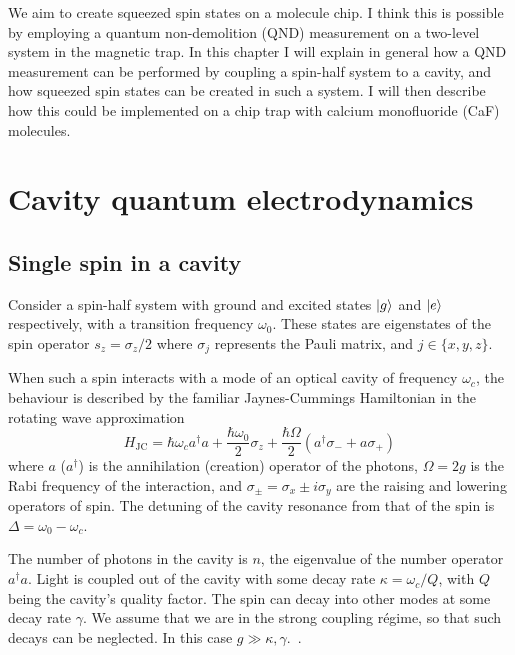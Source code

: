 We aim to create squeezed spin states on a molecule chip. I think this is
possible by employing a quantum non-demolition (QND) measurement on a two-level
system in the magnetic trap. In this chapter I will explain in general how
a QND measurement can be performed by coupling a spin-half system to a cavity,
and how squeezed spin states can be created in such a system. I will then
describe how this could be implemented on a chip trap with calcium monofluoride
(CaF) molecules.

\section{Cavity quantum electrodynamics}

\subsection{Single spin in a cavity}

Consider a spin-half system with ground and excited states $\ket{g}$
and $\ket{e}$ respectively, with a transition frequency $\omega_0$. These
states are eigenstates of the spin operator $s_z = \sigma_z /2$ where
$\sigma_j$ represents the Pauli matrix, and $j\in \{x,y,z\}$.

When such a spin interacts with a mode of an optical cavity of frequency
$\omega_c$, the behaviour is described by the familiar Jaynes-Cummings
Hamiltonian in the rotating wave approximation~\cite{}
%
\begin{equation}
  H_\text{JC} = \hbar\omega_c a^\dagger a + \frac{\hbar \omega_0}{2}\sigma_z +
  \frac{\hbar\Omega}{2}(a^\dagger \sigma_- + a\sigma_+)
  \label{squeeze:eqn:JCH}
\end{equation}
%
where $a$ ($a^\dagger$) is the annihilation (creation) operator of the photons,
$\Omega = 2g$ is the Rabi frequency of the interaction, and $\sigma_\pm =
\sigma_x \pm i\sigma_y$ are the raising and lowering operators of spin. The
detuning of the cavity resonance from that of the spin is $\Delta = \omega_0 -
\omega_c$.

The number of photons in the cavity is $n$, the eigenvalue of the number
operator $a^\dagger a$.  Light is coupled out of the cavity with some decay
rate $\kappa = \omega_c/Q$, with $Q$ being the cavity's quality factor. The
spin can decay into other modes at some decay rate $\gamma$. We assume that we
are in the strong coupling r\'egime, so that such decays can be neglected. In
this case $g \gg \kappa, \gamma$.~\cite{PhysRevA.69.062320}.


